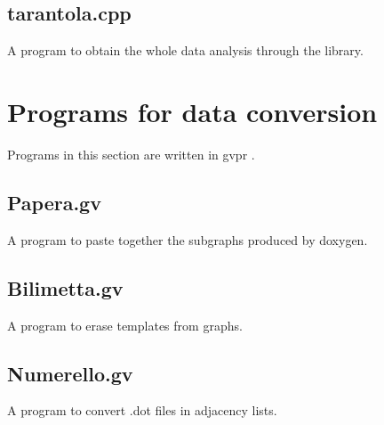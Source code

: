 \subsection{tarantola.cpp}
A program to obtain the whole data analysis through the library.

\vspace{0.5cm}


\section{Programs for data conversion}
\label{app}
Programs in this section are written in gvpr \cite{gvpr}.
\subsection{Papera.gv}
A program to paste together the subgraphs produced by doxygen.

\vspace{0.5cm}

\subsection{Bilimetta.gv}
A program to erase templates from graphs.

\vspace{0.5cm}

\subsection{Numerello.gv}
A program to convert .dot files in adjacency lists.



